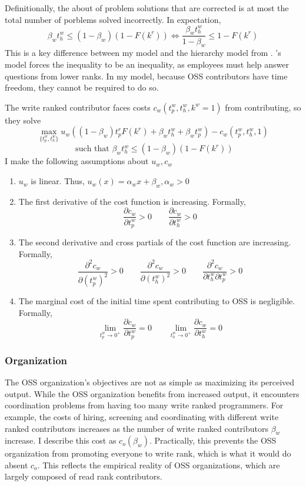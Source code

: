 \documentclass[12pt,notitlepage]{article}
\begin{document}
Definitionally, the about of problem solutions that are corrected is at most the total number of porblems solved incorrectly. In expectation, 
$$\beta_w t_h^w \leq (1-\beta_w)(1-F(k^r)) \iff \frac{\beta_w t_h^w}{1-\beta_w} \leq 1-F(k^r)$$
This is a key difference between my model and the hierarchy model from \cite{garicano_hierarchies_2000}. \cite{garicano_hierarchies_2000}'s model forces the inequality to be an inequality, as employees must help answer questions from lower ranks. In my model, because OSS contributors have time freedom, they cannot be required to do so.  

The write ranked contributor faces costs $c_w(t_p^w, t_h^w, k^w = 1)$ from contributing, so they solve
$$\max_{\{t_p^w, t_h^w\}} u_w\left((1-\beta_w) t_p^r F(k^r) + \beta_w t_h^w + \beta_w t_p^w\right) - c_w(t_p^w, t_h^w, 1)$$
$$ \text{ such that } \beta_w t_h^w \leq (1-\beta_w)(1-F(k^r))$$
I make the following assumptions about $u_w, c_w$
\begin{enumerate}
    \item $u_w$ is linear. Thus, $u_w(x) = \alpha_wx + \beta_w, \alpha_w > 0$
    \item The first derivative of the cost function is increasing. Formally, 
    $$\frac{\partial c_w}{\partial t_p^w}>0 \qquad  \frac{\partial c_w}{\partial t_h^w}>0$$
    \item  The second derivative and cross partials of the cost function are increasing. Formally, $$\frac{\partial^2 c_w}{\partial (t_p^w)^2}>0 \qquad  \frac{\partial^2 c_w}{\partial (t_h^w)^2}>0 \qquad  \frac{\partial^2 c_w}{\partial t_h^w \partial t_p^w}>0$$
    \item The marginal cost of the initial time spent contributing to OSS is negligible. Formally,
    $$\lim_{t_p^w \to 0^+} \frac{\partial c_w}{\partial t_p^w} = 0 \qquad \lim_{t_h^w \to 0^+} \frac{\partial c_w}{\partial t_h^w} = 0$$
\end{enumerate}
\subsubsection{Organization}
The OSS organization's objectives are not as simple as maximizing its perceived output. While the OSS organization benefits from increased output, it encounters coordination problems from having too many write ranked programmers. For example, the costs of hiring, screening and coordinating with different write ranked contributors increases as the number of write ranked contributors $\beta_w$ increase. I describe this cost as $c_o(\beta_w)$. Practically, this prevents the OSS organization from promoting everyone to write rank, which is what it would do absent $c_o$. This reflects the empirical reality of OSS organizations, which are largely composed of read rank contributors. 
\end{document}

